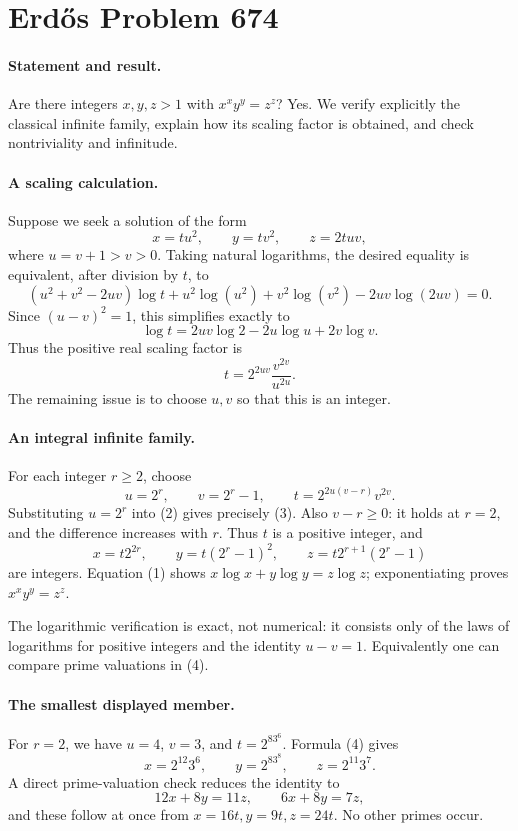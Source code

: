 \section*{Erd\H{o}s Problem 674}

\paragraph{Statement and result.}
Are there integers \(x,y,z>1\) with \(x^xy^y=z^z\)? Yes. We verify explicitly the classical infinite family, explain how its scaling factor is obtained, and check nontriviality and infinitude.

\paragraph{A scaling calculation.}
Suppose we seek a solution of the form
\[
 x=t u^2,\qquad y=t v^2,\qquad z=2tuv,
\]
where \(u=v+1>v>0\). Taking natural logarithms, the desired equality is equivalent, after division by \(t\), to
\[
 (u^2+v^2-2uv)\log t
 +u^2\log(u^2)+v^2\log(v^2)-2uv\log(2uv)=0.
\]
Since \((u-v)^2=1\), this simplifies exactly to
\[
 \log t=2uv\log2-2u\log u+2v\log v. \tag{1}
\]
Thus the positive real scaling factor is
\[
 t=2^{2uv}\frac{v^{2v}}{u^{2u}}. \tag{2}
\]
The remaining issue is to choose \(u,v\) so that this is an integer.

\paragraph{An integral infinite family.}
For each integer \(r\geq2\), choose
\[
 u=2^r,\qquad v=2^r-1,\qquad
 t=2^{2u(v-r)}v^{2v}. \tag{3}
\]
Substituting \(u=2^r\) into (2) gives precisely (3). Also \(v-r\geq0\): it holds at \(r=2\), and the difference increases with \(r\). Thus \(t\) is a positive integer, and
\[
 \boxed{\quad x=t2^{2r},\qquad y=t(2^r-1)^2,
 \qquad z=t2^{r+1}(2^r-1)\quad} \tag{4}
\]
are integers. Equation (1) shows \(x\log x+y\log y=z\log z\); exponentiating proves \(x^xy^y=z^z\).

The logarithmic verification is exact, not numerical: it consists only of the laws of logarithms for positive integers and the identity \(u-v=1\). Equivalently one can compare prime valuations in (4).

\paragraph{The smallest displayed member.}
For \(r=2\), we have \(u=4\), \(v=3\), and \(t=2^83^6\). Formula (4) gives
\[
 x=2^{12}3^6,\qquad y=2^83^8,\qquad z=2^{11}3^7.
\]
A direct prime-valuation check reduces the identity to
\[
 12x+8y=11z,\qquad 6x+8y=7z,
\]
and these follow at once from \(x=16t,y=9t,z=24t\). No other primes occur.


